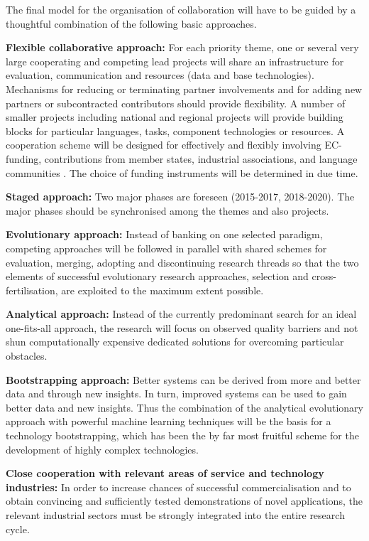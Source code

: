 \documentclass[10pt, plain]{../../metanetpaper}
\begin{document}
\begin{multicols}{2}
The final model for the organisation of collaboration will have to be guided by a thoughtful combination of the following basic approaches.

\textbf{Flexible collaborative approach:} For each priority theme, one or several very large cooperating and competing lead projects will share an infrastructure for evaluation, communication and resources (data and base technologies). Mechanisms for reducing or terminating partner involvements and for adding new partners or subcontracted contributors should provide flexibility. A number of smaller projects including national and regional projects will provide building blocks for particular languages, tasks, component technologies or resources. A cooperation scheme will be designed for effectively and flexibly involving EC-funding, contributions from member states, industrial associations, and language communities \cite{spector2012}. The choice of funding instruments will be determined in due time.

\textbf{Staged approach:} Two major phases are foreseen (2015-2017, 2018-2020). The major phases should be synchronised among the themes and also projects.   

\textbf{Evolutionary approach:} Instead of banking on one selected paradigm, competing approaches will be followed in parallel with shared schemes for evaluation, merging, adopting and discontinuing research threads so that the two elements of successful evolutionary research approaches, selection and cross-fertilisation, are exploited to the maximum extent possible.

\textbf{Analytical approach:} Instead of the currently predominant search for an ideal one-fits-all approach, the research will focus on observed quality barriers and not shun computationally expensive dedicated solutions for overcoming particular obstacles.

\textbf{Bootstrapping approach:} Better systems can be derived from more and better data and through new insights. In turn, improved systems can be used to gain better data and new insights. Thus the combination of the analytical evolutionary approach with powerful machine learning techniques will be the basis for a technology bootstrapping, which has been the by far most fruitful scheme for the development of highly complex technologies.

\textbf{Close cooperation with relevant areas of service and technology industries:} In order to increase chances of successful commercialisation and to obtain convincing and sufficiently tested demonstrations of novel applications, the relevant industrial sectors must be strongly integrated into the entire research cycle.


\end{multicols}
\end{document}
